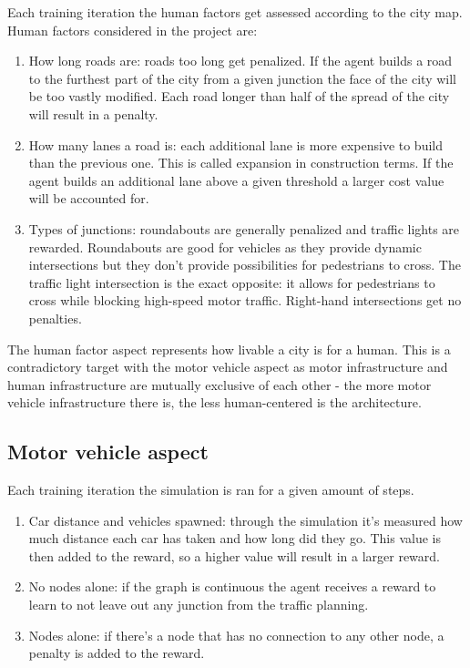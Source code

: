 \documentclass[
]{elteikthesis}[2023/04/10]
\begin{document}
Each training iteration the human factors get assessed according to
the city map. Human factors considered in the project are: 
\begin{enumerate}
\item How long roads are: roads too long get penalized. If the agent builds
a road to the furthest part of the city from a given junction the
face of the city will be too vastly modified. Each road longer than
half of the spread of the city will result in a penalty.
\item How many lanes a road is: each additional lane is more expensive to
build than the previous one. This is called expansion in construction
terms. If the agent builds an additional lane above a given threshold
a larger cost value will be accounted for.
\item Types of junctions: roundabouts are generally penalized and traffic
lights are rewarded. Roundabouts are good for vehicles as they provide
dynamic intersections but they don't provide possibilities for pedestrians
to cross. The traffic light intersection is the exact opposite: it
allows for pedestrians to cross while blocking high-speed motor traffic.
Right-hand intersections get no penalties. 
\end{enumerate}
The human factor aspect represents how livable a city is for a human.
This is a contradictory target with the motor vehicle aspect as motor
infrastructure and human infrastructure are mutually exclusive of each
other - the more motor vehicle infrastructure there is, the less human-centered
is the architecture.

\subsection{Motor vehicle aspect}

Each training iteration the simulation is ran for a given amount of
steps. 
\begin{enumerate}
\item Car distance and vehicles spawned: through the simulation it's measured
how much distance each car has taken and how long did they go. This
value is then added to the reward, so a higher value will result in
a larger reward. 
\item No nodes alone: if the graph is continuous the agent receives a reward
to learn to not leave out any junction from the traffic planning. 
\item Nodes alone: if there's a node that has no connection to any other
node, a penalty is added to the reward.
\end{enumerate}
\end{document}
